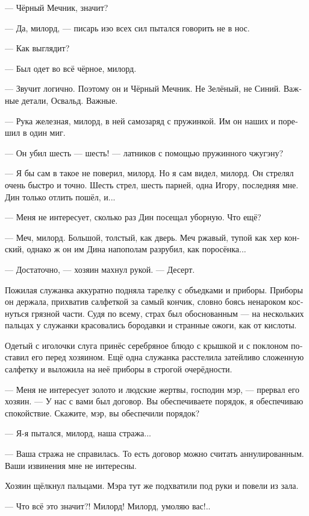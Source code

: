\documentclass[a4paper,12pt,fleqn]{book}\usepackage{polyglossia}\setdefaultlanguage[babelshorthands=true]{russian}\setotherlanguage{english}\defaultfontfeatures{Ligatures=TeX,Mapping=tex-text}\usepackage{xcolor}\newcommand{\ml}[3]{#2}
\newcommand{\asterism}{\vspace{1em}{\centering\Large\bfseries$\ast~\ast~\ast$\par}\vspace{1em}}
\begin{document}
--- Чёрный Мечник, значит?

--- Да, милорд, --- писарь изо всех сил пытался говорить не в нос.

--- Как выглядит?

--- Был одет во всё чёрное, милорд.

--- Звучит логично.
Поэтому он и Чёрный Мечник.
Не Зелёный, не Синий.
Важные детали, Освальд.
Важные.

--- Рука железная, милорд, в ней самозаряд с пружинкой.
Им он наших и порешил в один миг.

--- Он убил шесть --- шесть! --- латников с помощью пружинного чжугэну?

--- Я бы сам в такое не поверил, милорд.
Но я сам видел, милорд.
Он стрелял очень быстро и точно.
Шесть стрел, шесть парней, одна Игору, последняя мне.
Дин только отлить пошёл, и...

--- Меня не интересует, сколько раз Дин посещал уборную.
Что ещё?

--- Меч, милорд.
Большой, толстый, как дверь.
Меч ржавый, тупой как хер конский, однако ж он им Дина напополам разрубил, как поросёнка...

--- Достаточно, --- хозяин махнул рукой.
--- Десерт.

Пожилая служанка аккуратно подняла тарелку с объедками и приборы.
Приборы он держала, прихватив салфеткой за самый кончик, словно боясь ненароком коснуться грязной части.
Судя по всему, страх был обоснованным --- на нескольких пальцах у служанки красовались бородавки и странные ожоги, как от кислоты.

Одетый с иголочки слуга принёс серебряное блюдо с крышкой и с поклоном поставил его перед хозяином.
Ещё одна служанка расстелила затейливо сложенную салфетку и выложила на неё приборы в строгой очерёдности.

\asterism

--- Меня не интересует золото и людские жертвы, господин мэр, --- прервал его хозяин.
--- У нас с вами был договор.
Вы обеспечиваете порядок, я обеспечиваю спокойствие.
Скажите, мэр, вы обеспечили порядок?

--- Я-я пытался, милорд, наша стража...

--- Ваша стража не справилась.
То есть договор можно считать аннулированным.
Ваши извинения мне не интересны.

Хозяин щёлкнул пальцами.
Мэра тут же подхватили под руки и повели из зала.

--- Что всё это значит?!
Милорд!
Милорд, умоляю вас!..
\end{document}
